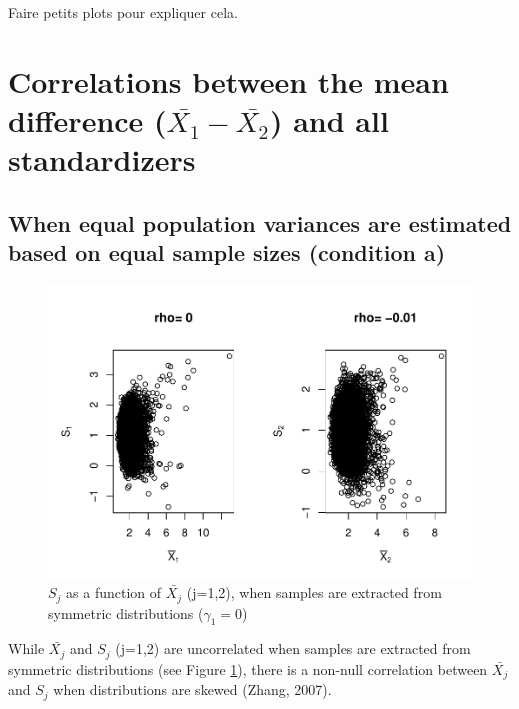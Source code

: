 \documentclass[
  man]{apa6}
\begin{document}
Faire petits plots pour expliquer cela.

\hypertarget{correlations-between-the-mean-difference-barx_1-barx_2-and-all-standardizers}{%
\section{\texorpdfstring{Correlations between the mean difference (\(\bar{X_1}-\bar{X_2}\)) and all standardizers}{Correlations between the mean difference (\textbackslash bar\{X\_1\}-\textbackslash bar\{X\_2\}) and all standardizers}}\label{correlations-between-the-mean-difference-barx_1-barx_2-and-all-standardizers}}

\hypertarget{when-equal-population-variances-are-estimated-based-on-equal-sample-sizes-condition-a}{%
\subsection{When equal population variances are estimated based on equal sample sizes (condition a)}\label{when-equal-population-variances-are-estimated-based-on-equal-sample-sizes-condition-a}}

\begin{figure}
\centering
\includegraphics{Correlations-between-the-sample-means-difference-and-standardizers-of-all-estimators,-and-implications-on-biases-and-variances-of-all-estimators_files/figure-latex/pltSDMEANHombalsym-1.pdf}
\caption{\label{fig:pltSDMEANHombalsym}\(S_j\) as a function of \(\bar{X_j}\) (j=1,2), when samples are extracted from symmetric distributions (\(\gamma_1 = 0\))}
\end{figure}

While \(\bar{X_j}\) and \(S_j\) (j=1,2) are uncorrelated when samples are extracted from symmetric distributions (see Figure \ref{fig:pltSDMEANHombalsym}), there is a non-null correlation between \(\bar{X_j}\) and \(S_j\) when distributions are skewed (Zhang, 2007).
\end{document}
